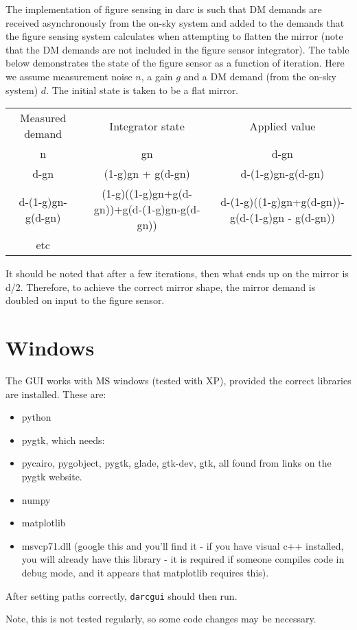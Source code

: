 \documentclass[a4,10pt]{article}
\begin{document}
The implementation of figure sensing in darc is such that DM demands
are received asynchronously from the on-sky system and added to the
demands that the figure sensing system calculates when attempting to
flatten the mirror (note that the DM demands are not included in the
figure sensor integrator).  The table below demonstrates the state of
the figure sensor as a function of iteration.  Here we assume
measurement noise $n$, a gain $g$ and a DM demand (from the on-sky
system) $d$.  The initial state is taken to be a flat mirror.

\begin{tabular}{ccc}
Measured demand & Integrator state & Applied value \\
n & gn & d-gn\\
d-gn & (1-g)gn + g(d-gn) & d-(1-g)gn-g(d-gn)\\
d-(1-g)gn-g(d-gn) & (1-g)((1-g)gn+g(d-gn))+g(d-(1-g)gn-g(d-gn)) & d-(1-g)((1-g)gn+g(d-gn))-g(d-(1-g)gn - g(d-gn))\\
etc &&\\
\end{tabular}

It should be noted that after a few iterations, then what ends up on
the mirror is d/2.  Therefore, to achieve the correct mirror shape,
the mirror demand is doubled on input to the figure sensor.

\section{Windows}
The GUI works with MS windows (tested with XP), provided the
correct libraries are installed.  These are:
\begin{itemize}
\item python
\item pygtk, which needs:
\item pycairo, pygobject, pygtk, glade, gtk-dev, gtk, all found from links
on the pygtk website.
\item numpy
\item matplotlib
\item msvcp71.dll (google this and you'll find it - if you have visual c++
installed, you will already have this library - it is required if
someone compiles code in debug mode, and it appears that matplotlib
requires this).
\end{itemize}
After setting paths correctly, {\tt darcgui} should then run.

Note, this is not tested regularly, so some code changes may
be necessary.
\end{document}
